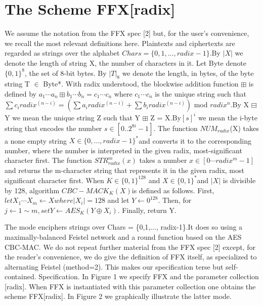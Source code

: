 \section{The Scheme FFX[radix]}
We assume the notation from the FFX spec [2] but, for the user’s convenience, we recall the most relevant definitions here. Plaintexts and ciphertexts are regarded as strings over the alphabet $Chars = \{0,1,...,radix-1\}$.By $|X|$ we denote the length of string X, the number of characters in it. Let Byte denote $\{0,1\}^8$, the set of 8-bit bytes. By $|T|_8$ we denote the length, in bytes, of the byte string T $\in$ Byte*. With radix understood, the blockwise addition function $\boxplus$ is defined by $a_1 \cdots a_n \boxplus b_1 \cdots b_n = c_1 \cdots c_n$ where $c_1 \cdots c_n$ is the unique string such that $\sum c_i radix^{(n-i)} = (\sum a_i radix^{(n-i)} + \sum b_i radix^{(n-i)})$ mod $radix^n$.By X $\boxminus$ Y we mean the unique string Z such that Y $\boxplus$ Z = X.By$[s]^i$ we mean the i-byte string that encodes the number $s\in [0..2^{8i}-1]$. The function $NUM_{radix}$(X) takes a none empty string $X \in \{0,...,radix-1\}^*$and converts it to the corresponding number, where the number is interpreted in the given radix, most-significant character first. The function $STR_{radix}^m (x)$ takes a number $x \in [0 \cdots radix^m-1]$ and returns the m-character string that represents it in the given radix, most significant character first.
When $K \in \{0,1\}^{128}$ and $X \in \{0,1\}^*$and $|X|$ is divisible by 128, algorithm $CBC-MACK_K(X)$is defined as follows. First, $let X_1 \cdots X_m \leftarrow X where |X_i| = 128$ and let $Y \leftarrow 0^{128}$. Then, for $j \leftarrow 1 \sim m,set Y \leftarrow AES_K(Y \oplus X_i)$. Finally, return Y.


The mode enciphers strings over Chars = \{0,1,..., radix-1\}.It does so using a maximally-balanced Feistel network and a round function based on the AES CBC-MAC.
We do not repeat further material from the FFX spec [2] except, for the reader’s convenience, we do give the definition of FFX itself, as specialized to alternating Feistel (method=2). This makes our specification terse but self-contained.
Specification. In Figure 1 we specify FFX and the parameter collection [radix]. When FFX is instantiated with this parameter collection one obtains the scheme FFX[radix]. In Figure 2 we graphically illustrate the latter mode.


